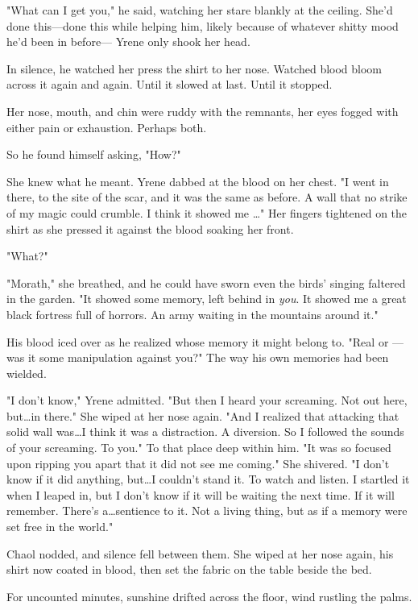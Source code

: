 "What can I get you," he said, watching her stare blankly at the ceiling.
She'd done this---done this while helping him, likely because of whatever shitty mood he'd been in before--- Yrene only shook her head.

In silence, he watched her press the shirt to her nose.
Watched blood bloom across it again and again.
Until it slowed at last.
Until it stopped.

Her nose, mouth, and chin were ruddy with the remnants, her eyes fogged with either pain or exhaustion.
Perhaps both.

So he found himself asking, "How?"

She knew what he meant.
Yrene dabbed at the blood on her chest.
"I went in there, to the site of the scar, and it was the same as before.
A wall that no strike of my magic could crumble.
I think it showed me \ldots" Her fingers tightened on the shirt as she pressed it against the blood soaking her front.

"What?"

"Morath," she breathed, and he could have sworn even the birds' singing faltered in the garden.
"It showed some memory, left behind in \emph{you}.
It showed me a great black fortress full of horrors.
An army waiting in the mountains around it."

His blood iced over as he realized whose memory it might belong to.
"Real or ---was it some manipulation against you?"
The way his own memories had been wielded.

"I don't know," Yrene admitted.
"But then I heard your screaming.
Not out here, but\ldots in there."
She wiped at her nose again.
"And I realized that attacking that solid wall was\ldots I think it was a distraction.
A diversion.
So I followed the sounds of your screaming.
To you."
To that place deep within him.
"It was so focused upon ripping you apart that it did not see me coming."
She shivered.
"I don't know if it did anything, but\ldots I couldn't stand it.
To watch and listen.
I startled it when I leaped in, but I don't know if it will be waiting the next time.
If it will remember.
There's a\ldots sentience to it.
Not a living thing, but as if a memory were set free in the world."

Chaol nodded, and silence fell between them.
She wiped at her nose again, his shirt now coated in blood, then set the fabric on the table beside the bed.

For uncounted minutes, sunshine drifted across the floor, wind rustling the palms.

